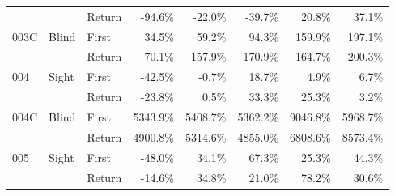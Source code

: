 \begin{table}[!htb]
\begin{tabular}{lllrrrrr}
    &       & Return &   -94.6\% &   -22.0\% &                                               -39.7\% &                                                 20.8\% &    37.1\% \\
003C & Blind & First &    34.5\% &    59.2\% &                                                94.3\% &                                                159.9\% &   197.1\% \\
    &       & Return &    70.1\% &   157.9\% &                                               170.9\% &                                                164.7\% &   200.3\% \\
004 & Sight & First &   -42.5\% &    -0.7\% &                                                18.7\% &                                                  4.9\% &     6.7\% \\
    &       & Return &   -23.8\% &     0.5\% &                                                33.3\% &                                                 25.3\% &     3.2\% \\
004C & Blind & First &  5343.9\% &  5408.7\% &                                              5362.2\% &                                               9046.8\% &  5968.7\% \\
    &       & Return &  4900.8\% &  5314.6\% &                                              4855.0\% &                                               6808.6\% &  8573.4\% \\
005 & Sight & First &   -48.0\% &    34.1\% &                                                67.3\% &                                                 25.3\% &    44.3\% \\
    &       & Return &   -14.6\% &    34.8\% &                                                21.0\% &                                                 78.2\% &    30.6\% \\
\bottomrule
\end{tabular}
\end{table}

